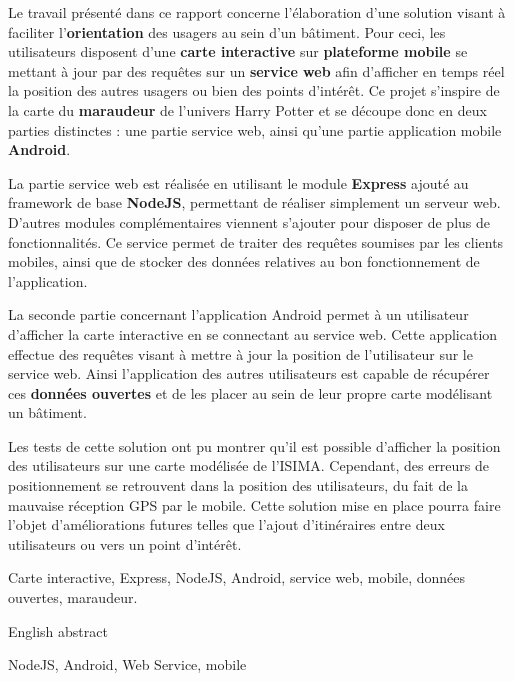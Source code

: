 

Le travail présenté dans ce rapport concerne l'élaboration d'une solution visant à faciliter l’\textbf{orientation} des usagers au sein d'un bâtiment. Pour ceci, les utilisateurs disposent d'une \textbf{carte interactive} sur \textbf{plateforme mobile} se mettant à jour par des requêtes sur un \textbf{service web} afin d’afficher en temps réel la position des autres usagers ou bien des points d’intérêt. Ce projet s’inspire de la carte du \textbf{maraudeur} de l’univers Harry Potter et se découpe donc en deux parties distinctes : une partie service web, ainsi qu'une partie application mobile \textbf{Android}.

La partie service web est réalisée en utilisant le module \textbf{Express} ajouté au framework de base \textbf{NodeJS}, permettant de réaliser simplement un serveur web. D'autres modules complémentaires viennent s'ajouter pour disposer de plus de fonctionnalités. Ce service permet de traiter des requêtes soumises par les clients mobiles, ainsi que de stocker des données relatives au bon fonctionnement de l'application.

La seconde partie concernant l'application Android permet à un utilisateur d’afficher la carte interactive en se connectant au service web. Cette application effectue des requêtes visant à mettre à jour la position de l'utilisateur sur le service web. Ainsi l’application des autres utilisateurs est capable de récupérer ces \textbf{données ouvertes} et de les placer au sein de leur propre carte modélisant un bâtiment.

Les tests de cette solution ont pu montrer qu'il est possible d'afficher la position des utilisateurs sur une carte modélisée de l'ISIMA. Cependant, des erreurs de positionnement se retrouvent dans la position des utilisateurs, du fait de la mauvaise réception GPS par le mobile. Cette solution mise en place pourra faire l'objet d'améliorations futures telles que l'ajout d'itinéraires entre deux utilisateurs ou vers un point d'intérêt.

Carte interactive, Express, NodeJS, Android, service web, mobile, données ouvertes, maraudeur.



English abstract

NodeJS, Android, Web Service, mobile

